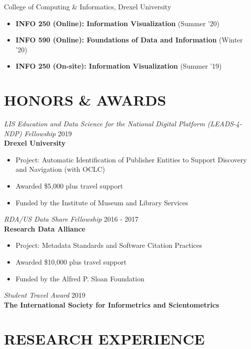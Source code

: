 \documentclass[margin, 10pt]{res} %
\begin{document}
\begin{resume}
College of Computing \& Informatics, Drexel University

\begin{itemize}
\item \textbf{INFO 250 (Online): Information Visualization} (Summer '20)
\item \textbf{INFO 590 (Online): Foundations of Data and Information} (Winter '20)
\item \textbf{INFO 250 (On-site): Information Visualization} (Summer '19)
\end{itemize}

\section{HONORS \& AWARDS}

{\sl LIS Education and Data Science for the National Digital Platform (LEADS-4-NDP) Fellowship}  \hfill 2019 \\
\textbf{Drexel University}
\begin{itemize}
\item Project: Automatic Identification of Publisher Entities to Support Discovery and Navigation (with OCLC)
\item Awarded \$5,000 plus travel support
\item Funded by the Institute of Museum and Library Services
\end{itemize} 

{\sl RDA/US Data Share Fellowship}  \hfill 2016 - 2017 \\
\textbf{Research Data Alliance}
\begin{itemize}
\item Project: Metadata Standards and Software Citation Practices
\item Awarded \$10,000 plus travel support
\item Funded by the Alfred P. Sloan Foundation
\end{itemize} 

{\sl Student Travel Award} \hfill 2019 \\
\textbf{The International Society for Informetrics and Scientometrics}

\section{RESEARCH EXPERIENCE}


\end{resume}
\end{document}
